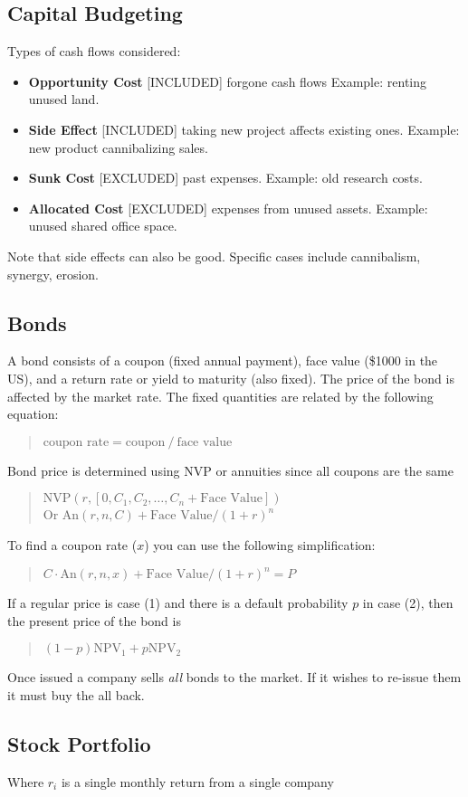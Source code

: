 \subsection{Capital Budgeting}
Types of cash flows considered:
\begin{itemize}
  \item \textbf{Opportunity Cost} [INCLUDED] forgone cash flows Example: renting unused land.
  \item \textbf{Side Effect} [INCLUDED] taking new project affects existing ones. Example: new product cannibalizing sales.
  \item \textbf{Sunk Cost} [EXCLUDED] past expenses. Example: old research costs.
  \item \textbf{Allocated Cost} [EXCLUDED] expenses from unused assets. Example: unused shared office space.
\end{itemize}
Note that side effects can also be good. Specific cases include
cannibalism, synergy, erosion.

\subsection{Bonds}
A bond consists of a coupon (fixed annual payment), face value (\$1000
in the US), and a return rate or yield to maturity (also fixed). The
price of the bond is affected by the market rate. The fixed quantities
are related by the following equation:

\blockquote{$\text{coupon rate}=\text{coupon} ~/~ \text{face value}$}

Bond price is determined using NVP or annuities since all coupons are
the same

\blockquote{
  $\mathrm{NVP}(r, [0,C_1,C_2,\dots,C_n+\text{Face Value}])$ \\
  Or $\mathrm{An}(r,n,C) + \text{Face Value}/(1+r)^{n}$
}

To find a coupon rate ($x$) you can use the following simplification:

\blockquote{$C\cdot\mathrm{An}(r,n,x) + \text{Face Value}/(1+r)^{n}=P$}

If a regular price is case (1) and there is a default probability $p$ in
case (2), then the present price of the bond is

\blockquote{$(1-p)\mathrm{NPV}_1 + p\mathrm{NPV}_2$}

Once issued a company sells \textit{all} bonds to the market. If it
wishes to re-issue them it must buy the all back.

\subsection{Stock Portfolio}
Where $r_i$ is a single monthly return from a single company

